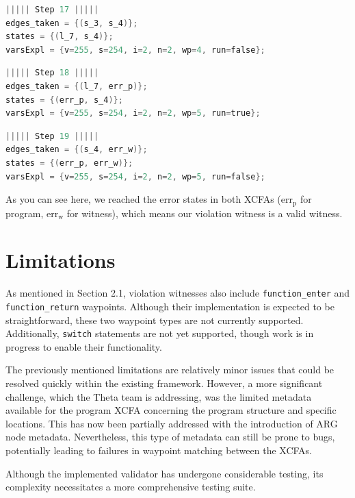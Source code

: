 \begin{lstlisting}[style=C, language=C, basicstyle=\ttfamily\footnotesize, columns=flexible,
    breaklines=true, breakatwhitespace=true, tabsize=2, showstringspaces=false]
||||| Step 17 |||||
edges_taken = {(s_3, s_4)};
states = {(l_7, s_4)};
varsExpl = {v=255, s=254, i=2, n=2, wp=4, run=false};
\end{lstlisting}
\begin{lstlisting}[style=C, language=C, basicstyle=\ttfamily\footnotesize, columns=flexible,
    breaklines=true, breakatwhitespace=true, tabsize=2, showstringspaces=false]
||||| Step 18 |||||
edges_taken = {(l_7, err_p)};
states = {(err_p, s_4)};
varsExpl = {v=255, s=254, i=2, n=2, wp=5, run=true};
\end{lstlisting}
\begin{lstlisting}[style=C, language=C, basicstyle=\ttfamily\footnotesize, columns=flexible,
    breaklines=true, breakatwhitespace=true, tabsize=2, showstringspaces=false]
||||| Step 19 |||||
edges_taken = {(s_4, err_w)};
states = {(err_p, err_w)};
varsExpl = {v=255, s=254, i=2, n=2, wp=5, run=false};
\end{lstlisting}
As you can see here, we reached the error states in both XCFAs ($\text{err}_\text{p}$ for program,
$\text{err}_\text{w}$ for witness), which means our violation witness is a valid witness.


\section{Limitations}

As mentioned in Section 2.1, violation witnesses also include \texttt{function\_enter} and
\texttt{function\_return} waypoints. Although their implementation is expected to be
straightforward, these two waypoint types are not currently supported.
Additionally, \texttt{switch} statements are not yet supported, though work is in progress
to enable their functionality.

The previously mentioned limitations are relatively minor issues that could be resolved
quickly within the existing framework. However, a more significant challenge, which the
Theta team is addressing, was the limited metadata available for the program XCFA
concerning the program structure and specific locations. This has now been partially
addressed with the introduction of ARG node metadata. Nevertheless, this type of metadata
can still be prone to bugs, potentially leading to failures in waypoint matching between
the XCFAs.

Although the implemented validator has undergone considerable testing, its complexity
necessitates a more comprehensive testing suite.
